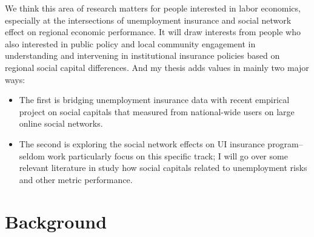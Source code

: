 \documentclass{article}
\begin{document}
We think this area of research matters for people interested in labor economics, especially at the intersections of unemployment insurance and social network effect on regional economic performance. It will draw interests from people who also interested in public policy and local community engagement in understanding and intervening in institutional insurance policies based on regional social capital differences. And my thesis adds values in mainly two major ways: 
\begin{itemize}
\item The first is bridging unemployment insurance data with recent empirical project on social capitals that measured from national-wide users on large online social networks.

\item The second is exploring the social network effects on UI insurance program--seldom work particularly focus on this specific track; I will go over some relevant literature in study how social capitals related to unemployment risks and other metric performance.
 
\end{itemize}



\section{Background}
\end{document}
